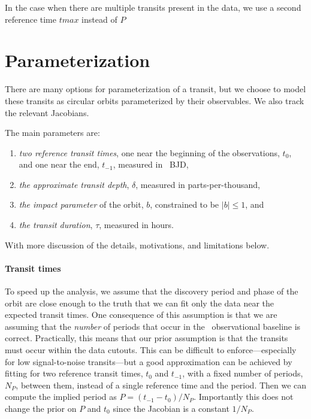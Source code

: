 \documentclass[linenumbers,floatfix,ApJL,twocolumn]{aastex631}
\begin{document}
In the case when there are multiple transits present in the data, we use a second reference time $tmax$ instead of $P$


\section{Parameterization}

There are many options for parameterization of a transit, but we choose to model these transits as circular orbits parameterized by their observables.
We also track the relevant Jacobians.

The main parameters are:
\begin{enumerate}
  \item \emph{two reference transit times}, one near the beginning of the observations, $t_0$, and one near the end, $t_{-1}$, measured in \tess\ BJD,
  \item \emph{the approximate transit depth}, $\delta$, measured in parts-per-thousand,
  \item \emph{the impact parameter} of the orbit, $b$, constrained to be $|b| \le 1$, and
  \item \emph{the transit duration}, $\tau$, measured in hours.
\end{enumerate}

With more discussion of the details, motivations, and limitations below.

\paragraph{Transit times}
To speed up the analysis, we assume that the discovery period and phase of the orbit are close enough to the truth that we can fit only the data near the expected transit times.
One consequence of this assumption is that we are assuming that the \emph{number} of periods that occur in the \tess\ observational baseline is correct.
Practically, this means that our prior assumption is that the transits must occur within the data cutouts.
This can be difficult to enforce---especially for low signal-to-noise transits---but a good approximation can be achieved by fitting for two reference transit times, $t_0$ and $t_{-1}$, with a fixed number of periods, $N_P$, between them, instead of a single reference time and the period.
Then we can compute the implied period as $P = (t_{-1} - t_0) / N_P$.
Importantly this does not change the prior on $P$ and $t_0$ since the Jacobian is a constant $1/N_P$.
\end{document}
